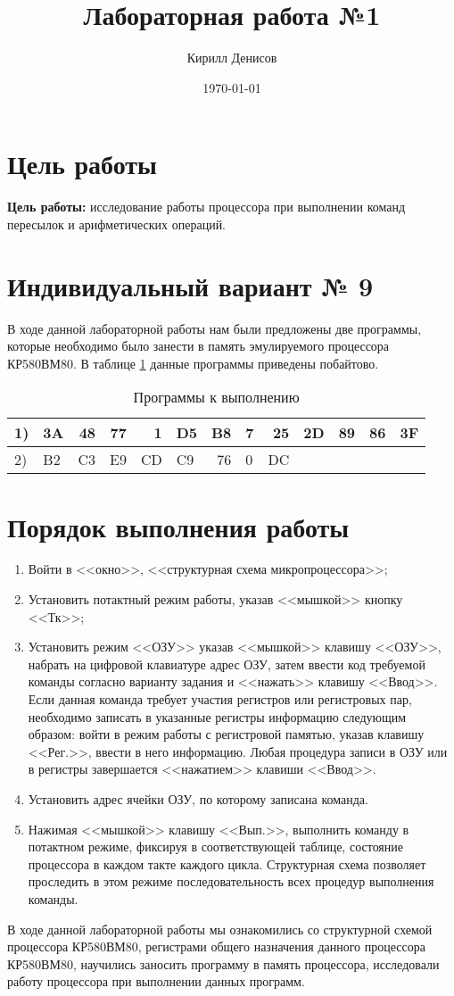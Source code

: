 \documentclass[a4paper,14pt]{extarticle}
\author{Кирилл Денисов}
\title{Лабораторная работа №1}
\date{\today}
\newcommand{\pathToCommonFolder}{/home/denilai/Documents/repos/latex/Common}
\begin{document}
	\thispagestyle{empty}
	
	\newpage
	
\section{Цель работы}
\textbf{Цель работы: } исследование
работы процессора при выполнении команд пересылок и
арифметических операций.
\section {Индивидуальный вариант № 9}
В ходе данной лабораторной работы нам были предложены две программы, которые необходимо было занести в память эмулируемого процессора КР580ВМ80. В таблице \ref{tab:progs} данные программы приведены побайтово.
\begin{table}[htbp]
	\begin{center}
		\begin{tabular}{|l|l|l|l|l|l|l|l|l|l|l|l|l|}
			\hline
			1) & 3A & \multicolumn{1}{r|}{48} & \multicolumn{1}{r|}{77} & \multicolumn{1}{r|}{1} & D5 & B8 & 7 & \multicolumn{1}{r|}{25} & 2D & \multicolumn{1}{r|}{89} & \multicolumn{1}{r|}{86}&3F \\ \hline
			2) & B2 & C3 & E9 & CD & C9 & \multicolumn{1}{r|}{76} & 0 & DC & & & &\\ \hline
		\end{tabular}
	\end{center}
	\caption{Программы к выполнению}
	\label{tab:progs}
\end{table}
\section{Порядок выполнения работы}
\begin{enumerate}
\item Войти в
<<окно>>,
<<структурная
схема
микропроцессора>>;
\item 
Установить потактный режим работы, указав
<<мышкой>> кнопку <<Тк>>;
\item
Установить режим <<ОЗУ>> указав <<мышкой>>
клавишу <<ОЗУ>>, набрать на цифровой клавиатуре адрес
ОЗУ, затем ввести код требуемой команды согласно
варианту задания и <<нажать>> клавишу <<Ввод>>. Если данная
команда требует участия регистров или регистровых пар,
необходимо записать в указанные регистры информацию
следующим образом: войти в режим работы с регистровой
памятью, указав клавишу <<Рег.>>, ввести в него информацию.
Любая процедура записи в ОЗУ или в регистры завершается <<нажатием>> клавиши <<Ввод>>.
\item 
Установить адрес ячейки ОЗУ, по которому
записана команда.
\item 
Нажимая <<мышкой>> клавишу <<Вып.>>, выполнить
команду в потактном режиме, фиксируя в соответствующей таблице,
состояние процессора в каждом такте каждого цикла.
Структурная схема позволяет проследить в этом режиме
последовательность всех процедур выполнения команды.
\end{enumerate}

В ходе данной лабораторной работы мы ознакомились со структурной схемой процессора КР580ВМ80, регистрами общего назначения данного процессора КР580ВМ80, научились заносить программу в память процессора, исследовали работу процессора при выполнении данных программ.
\end{document}
